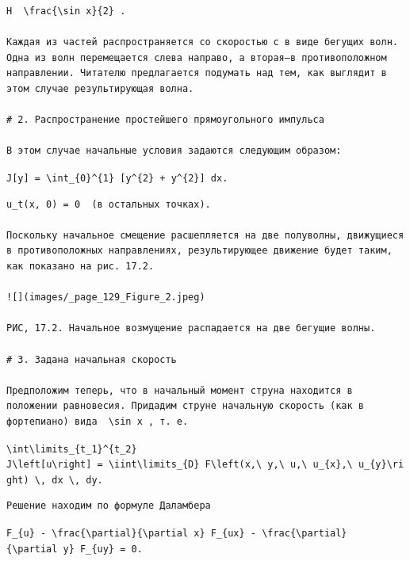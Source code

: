 \documentclass[
  ukrainian,
]{article}
\begin{document}
\begin{verbatim}
H  \frac{\sin x}{2} .

Каждая из частей распространяется со скоростью с в виде бегущих волн. Одна из волн перемещается слева направо, а вторая—в противоположном направлении. Читателю предлагается подумать над тем, как выглядит в этом случае результирующая волна.

# 2. Распространение простейшего прямоугольного импульса

В этом случае начальные условия задаются следующим образом:
\end{verbatim}

\texttt{J{[}y{]}\ =\ \textbackslash{}int\_\{0\}\^{}\{1\}\ {[}y\^{}\{2\}\ +\ y\textquotesingle{}\^{}\{2\}{]}\ dx.}

\begin{verbatim}
u_t(x, 0) = 0  (в остальных точках).

Поскольку начальное смещение расшепляется на две полуволны, движущиеся в противоположных направлениях, результирующее движение будет таким, как показано на рис. 17.2.

![](images/_page_129_Figure_2.jpeg)

РИС, 17.2. Начальное возмущение распадается на две бегущие волны.

# 3. Задана начальная скорость

Предположим теперь, что в начальный момент струна находится в положении равновесия. Придадим струне начальную скорость (как в фортепиано) вида  \sin x , т. е.
\end{verbatim}

\texttt{\textbackslash{}int\textbackslash{}limits\_\{t\_1\}\^{}\{t\_2\}}
\texttt{J\textbackslash{}left{[}u\textbackslash{}right{]}\ =\ \textbackslash{}iint\textbackslash{}limits\_\{D\}\ F\textbackslash{}left(x,\textbackslash{}\ y,\textbackslash{}\ u,\textbackslash{}\ u\_\{x\},\textbackslash{}\ u\_\{y\}\textbackslash{}right)\ \textbackslash{},\ dx\ \textbackslash{},\ dy.}

\begin{verbatim}
Решение находим по формуле Даламбера
\end{verbatim}

\texttt{F\_\{u\}\ -\ \textbackslash{}frac\{\textbackslash{}partial\}\{\textbackslash{}partial\ x\}\ F\_\{ux\}\ -\ \textbackslash{}frac\{\textbackslash{}partial\}\{\textbackslash{}partial\ y\}\ F\_\{uy\}\ =\ 0.}
\end{document}
